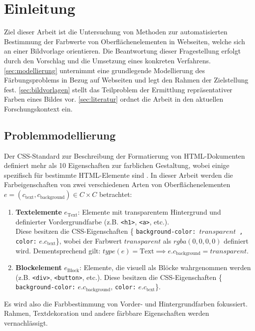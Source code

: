 \section{Einleitung}

Ziel dieser Arbeit ist die Untersuchung von Methoden zur automatisierten Bestimmung der Farbwerte von Oberflächenelementen in Webseiten, welche sich an einer Bildvorlage orientieren. Die Beantwortung dieser Fragestellung erfolgt durch den Vorschlag und die Umsetzung eines konkreten Verfahrens. \autoref{sec:modellierung} unternimmt eine grundlegende Modellierung des Färbungsproblems in Bezug auf Webseiten und legt  den Rahmen der Zielstellung fest. \autoref{sec:bildvorlagen} stellt das Teilproblem der Ermittlung repräsentativer Farben eines Bildes vor. \autoref{sec:literatur} ordnet die Arbeit in den aktuellen Forschungskontext ein.

\subsection{Problemmodellierung}
\label{sec:modellierung}

Der CSS-Standard zur Beschreibung der Formatierung von HTML-Dokumenten definiert mehr als 10 Eigenschaften zur farblichen Gestaltung, wobei einige spezifisch für bestimmte  HTML-Elemente sind  \citep{css3-color}. In dieser Arbeit werden die Farbeigenschaften von zwei verschiedenen Arten von Oberflächenelementen $e = (c_\text{text}, c_\text{background}) \in C \times C$ betrachtet:
\begin{enumerate}
	\item \textbf{Textelemente} $e_\text{Text}$: Elemente mit transparentem Hintergrund und definierter Vordergrundfarbe (z.B. \texttt{<h1>}, \texttt{<a>}, etc.).\\Diese besitzen die CSS-Eigenschaften \{ \texttt{background-color: }$transparent$\texttt{ , color:} $e.c_\text{text}$\}, wobei der Farbwert $transparent$ als $rgba(0, 0, 0, 0)$ definiert wird. Dementsprechend gilt: $type(e) = \text{Text} \implies e.c_\text{background} = transparent$.\\
	\item  \textbf{Blockelement} $e_\text{Block}$: Elemente, die visuell als Blöcke wahrgenommen werden (z.B. \texttt{<div>}, \texttt{<button>}, etc.). Diese besitzen die CSS-Eigenschaften \{ \texttt{background-color:} $e.c_\text{background}$, \texttt{color:} $e.c_\text{text}$\}.
\end{enumerate}
Es wird also die Farbbestimmung von Vorder- und Hintergrundfarben fokussiert. Rahmen, Textdekoration und andere färbbare Eigenschaften werden vernachlässigt.

